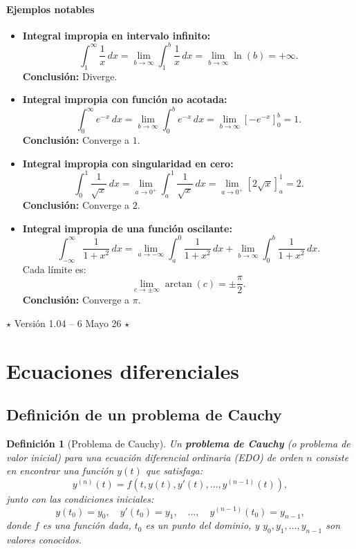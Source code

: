 \documentclass[12pt, a4paper]{article}
\theoremstyle{rioplatense}
\newtheorem{definicion}{Definición}[section]
\begin{document}
\paragraph{Ejemplos notables}

\begin{itemize}
    \item \textbf{Integral impropia en intervalo infinito:}
    \[
    \int_1^\infty \frac{1}{x} \, dx = \lim_{b \to \infty} \int_1^b \frac{1}{x} \, dx = \lim_{b \to \infty} \ln(b) = +\infty.
    \]
    \textbf{Conclusión:} Diverge.

    \item \textbf{Integral impropia con función no acotada:}
    \[
    \int_0^\infty e^{-x} \, dx = \lim_{b \to \infty} \int_0^b e^{-x} \, dx = \lim_{b \to \infty} \left[ -e^{-x} \right]_0^b = 1.
    \]
    \textbf{Conclusión:} Converge a \( 1 \).

    \item \textbf{Integral impropia con singularidad en cero:}
    \[
    \int_0^1 \frac{1}{\sqrt{x}} \, dx = \lim_{a \to 0^+} \int_a^1 \frac{1}{\sqrt{x}} \, dx = \lim_{a \to 0^+} \left[ 2\sqrt{x} \right]_a^1 = 2.
    \]
    \textbf{Conclusión:} Converge a \( 2 \).

    \item \textbf{Integral impropia de una función oscilante:}
    \[
    \int_{-\infty}^\infty \frac{1}{1+x^2} \, dx = \lim_{a \to -\infty} \int_a^0 \frac{1}{1+x^2} \, dx + \lim_{b \to \infty} \int_0^b \frac{1}{1+x^2} \, dx.
    \]
    Cada límite es:
    \[
    \lim_{c \to \pm\infty} \arctan(c) = \pm \frac{\pi}{2}.
    \]
    \textbf{Conclusión:} Converge a \( \pi \).
\end{itemize}

\begin{center}
$\star$
Versión 1.04 -- 6 Mayo 26
$\star$
\end{center}

\newpage 

\section{Ecuaciones diferenciales}

\subsection{Definición de un problema de Cauchy}
\begin{definicion}[Problema de Cauchy]
    Un \textbf{problema de Cauchy} (o problema de valor inicial) para una ecuación diferencial ordinaria (EDO) de orden $n$ consiste en encontrar una función $y(t)$ que satisfaga:
    $$
    y^{(n)}(t) = f(t, y(t), y'(t), \ldots, y^{(n-1)}(t)),
    $$
    junto con las condiciones iniciales:
    $$
    y(t_0) = y_0, \quad y'(t_0) = y_1, \quad \ldots, \quad y^{(n-1)}(t_0) = y_{n-1},
    $$
    donde $f$ es una función dada, $t_0$ es un punto del dominio, y $y_0, y_1, \ldots, y_{n-1}$ son valores conocidos.
\end{definicion}
\end{document}
